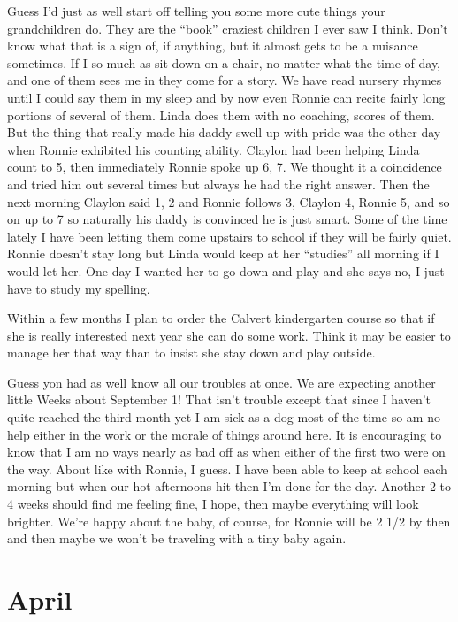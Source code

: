\documentclass[
]{book}
\begin{document}
Guess I'd just as well start off telling you some more cute things your grandchildren do. They are the ``book'' craziest children I ever saw I think. Don't know what that is a sign of, if anything, but it almost gets to be a nuisance sometimes. If I so much as sit down on a chair, no matter what the time of day, and one of them sees me in they come for a story. We have read nursery rhymes until I could say them in my sleep and by now even Ronnie can recite fairly long portions of several of them. Linda does them with no coaching, scores of them. But the thing that really made his daddy swell up with pride was the other day when Ronnie exhibited his counting ability. Claylon had been helping Linda count to 5, then immediately Ronnie spoke up 6, 7. We thought it a coincidence and tried him out several times but always he had the right answer. Then the next morning Claylon said 1, 2 and Ronnie follows 3, Claylon 4, Ronnie 5, and so on up to 7 so naturally his daddy is convinced he is just smart. Some of the time lately I have been letting them come upstairs to school if they will be fairly quiet. Ronnie doesn't stay long but Linda would keep at her ``studies'' all morning if I would let her. One day I wanted her to go down and play and she says no, I just have to study my spelling.

Within a few months I plan to order the Calvert kindergarten course so that if she is really interested next year she can do some work. Think it may be easier to manage her that way than to insist she stay down and play outside.

Guess yon had as well know all our troubles at once. We are expecting another little Weeks about September 1! That isn't trouble except that since I haven't quite reached the third month yet I am sick as a dog most of the time so am no help either in the work or the morale of things around here. It is
encouraging to know that I am no ways nearly as bad off as when either of the first two were on the way. About like with Ronnie, I guess. I have been able to keep at school each morning but when our hot afternoons hit then I'm done for the day. Another 2 to 4 weeks should find me feeling fine, I hope, then maybe everything will look brighter. We're happy about the baby, of course, for Ronnie will be 2 1/2 by then and then maybe we won't be traveling with a tiny baby again.

\hypertarget{april-1}{%
\section{April}\label{april-1}}
\end{document}
